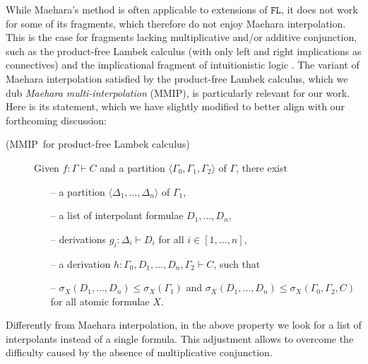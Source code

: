 \documentclass[sn-mathphys-num]{sn-jnl}%
\newcommand{\GG}{\Gamma}
\newcommand{\GD}{\Delta}
\newcommand{\vd}{\vdash}
\newcommand{\gs}[1]{\sigma_{X} (#1)}
\newcommand{\FL}{$\mathtt{FL}$}
\newcommand{\MMIP}{\textsf{MMIP}}
\newcommand{\niccolo}[1]{\textcolor{red}{NV: #1}}
\theoremstyle{thmstyleone}%
\theoremstyle{thmstyletwo}%
\theoremstyle{thmstylethree}%
\begin{document}
While Maehara's method is often applicable to extensions of \FL, it does not work for some of its fragments, which therefore do not enjoy Maehara interpolation. This is the case for fragments lacking multiplicative and/or additive conjunction, such as the product-free Lambek calculus \cite{Pentus1997} (with only left  and right implications as connectives) and the implicational fragment of intuitionistic logic \cite{Kanazawa2006}. 
The variant of Maehara interpolation satisfied by the product-free Lambek calculus, which we dub \emph{Maehara multi-interpolation} (\MMIP), is particularly relevant for our work. Here is its statement, which we have slightly modified to better align with our forthcoming discussion:
\begin{description}
  \item[(\MMIP~for product-free Lambek calculus)]  Given $f: \GG \vd C$ and a partition $\langle \GG_0,\GG_1, \GG_2 \rangle$ of $\GG$, there exist 
  \begin{itemize}
    \item[--] a partition $\langle \GD_1, \dots, \GD_n \rangle$ of $\GG_1$,
    \item[--] a list of interpolant formulae $D_1, \dots, D_n$,
    \item[--] derivations $g_i : \GD_i \vd D_i$ for all $i \in [1, \dots, n]$, 
    \item[--] a derivation $h : \GG_0, D_1, \dots, D_n, \GG_2 \vd C$, such that
    \item[--] $\gs{D_1, \dots, D_n} \leq \gs{\GG_1} $ and $\gs{D_1, \dots, D_n} \leq \gs{\GG_0, \GG_2, C}$ for all atomic formulae $X$.
  \end{itemize}
\end{description}
Differently from Maehara interpolation, in the above property we look for a  list of interpolants instead of a single formula.
This adjustment allows to overcome the difficulty caused by the absence of multiplicative conjunction.
\end{document}

